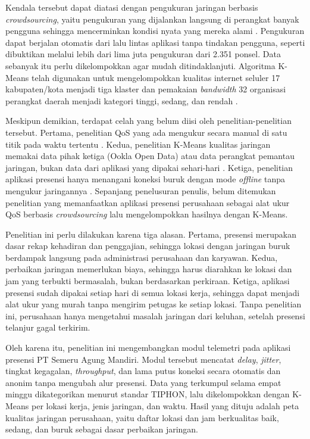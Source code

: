 Kendala tersebut dapat diatasi dengan pengukuran jaringan berbasis \textit{crowdsourcing}, yaitu pengukuran yang dijalankan langsung di perangkat banyak pengguna sehingga mencerminkan kondisi nyata yang mereka alami \parencite{wamser2021crowd}. Pengukuran dapat berjalan otomatis dari lalu lintas aplikasi tanpa tindakan pengguna, seperti dibuktikan \textcite{wu2017mopeye} melalui lebih dari lima juta pengukuran dari 2.351 ponsel. Data sebanyak itu perlu dikelompokkan agar mudah ditindaklanjuti. Algoritma K-Means telah digunakan untuk mengelompokkan kualitas internet seluler 17 kabupaten/kota menjadi tiga klaster \parencite{irwansyah2025kmeans} dan pemakaian \textit{bandwidth} 32 organisasi perangkat daerah menjadi kategori tinggi, sedang, dan rendah \parencite{mubarak2023kmeans}.

Meskipun demikian, terdapat celah yang belum diisi oleh penelitian-penelitian tersebut. Pertama, penelitian QoS yang ada mengukur secara manual di satu titik pada waktu tertentu \parencite{fiqria2024qos,rosid2023qos}. Kedua, penelitian K-Means kualitas jaringan memakai data pihak ketiga (Ookla Open Data) atau data perangkat pemantau jaringan, bukan data dari aplikasi yang dipakai sehari-hari \parencite{irwansyah2025kmeans,mubarak2023kmeans}. Ketiga, penelitian aplikasi presensi hanya menangani koneksi buruk dengan mode \textit{offline} tanpa mengukur jaringannya \parencite{indah2025offline,rokhman2026personalia}. Sepanjang penelusuran penulis, belum ditemukan penelitian yang memanfaatkan aplikasi presensi perusahaan sebagai alat ukur QoS berbasis \textit{crowdsourcing} lalu mengelompokkan hasilnya dengan K-Means.

Penelitian ini perlu dilakukan karena tiga alasan. Pertama, presensi merupakan dasar rekap kehadiran dan penggajian, sehingga lokasi dengan jaringan buruk berdampak langsung pada administrasi perusahaan dan karyawan. Kedua, perbaikan jaringan memerlukan biaya, sehingga harus diarahkan ke lokasi dan jam yang terbukti bermasalah, bukan berdasarkan perkiraan. Ketiga, aplikasi presensi sudah dipakai setiap hari di semua lokasi kerja, sehingga dapat menjadi alat ukur yang murah tanpa mengirim petugas ke setiap lokasi. Tanpa penelitian ini, perusahaan hanya mengetahui masalah jaringan dari keluhan, setelah presensi telanjur gagal terkirim.

Oleh karena itu, penelitian ini mengembangkan modul telemetri pada aplikasi presensi PT Semeru Agung Mandiri. Modul tersebut mencatat \textit{delay}, \textit{jitter}, tingkat kegagalan, \textit{throughput}, dan lama putus koneksi secara otomatis dan anonim tanpa mengubah alur presensi. Data yang terkumpul selama empat minggu dikategorikan menurut standar TIPHON, lalu dikelompokkan dengan K-Means per lokasi kerja, jenis jaringan, dan waktu. Hasil yang dituju adalah peta kualitas jaringan perusahaan, yaitu daftar lokasi dan jam berkualitas baik, sedang, dan buruk sebagai dasar perbaikan jaringan.

